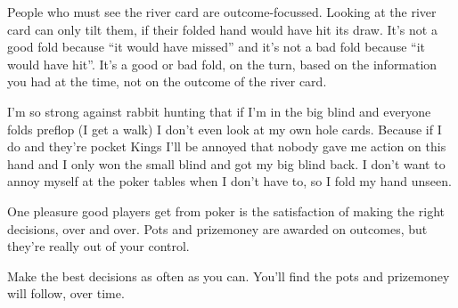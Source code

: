 People who must see the river card are outcome-focussed. Looking
at the river card can only tilt them, if their folded hand would
have hit its draw. It's not a good fold because ``it would have
missed'' and it's not a bad fold because ``it would have hit''. It's
a good or bad fold, on the turn, based on the information you
had at the time, not on the outcome of the river card.

I'm so strong against rabbit hunting that if I'm in the
big blind and everyone folds preflop (I get a walk) I don't even look
at my own hole cards. Because if I do and they're pocket Kings I'll be
annoyed that nobody gave me action on this hand and I only won the
small blind and got my big blind back. I don't want to annoy myself at
the poker tables when I don't have to, so I fold my hand unseen.

One pleasure good players get from poker is the satisfaction
of making the right decisions, over and over. Pots and prizemoney
are awarded on outcomes, but they're really out of your control.

Make the best decisions as often as you can. You'll find the pots
and prizemoney will follow, over time.
